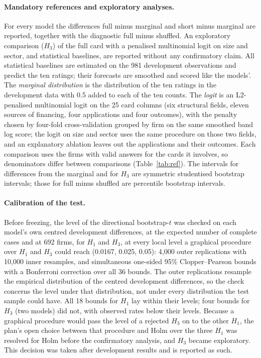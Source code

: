 \documentclass[11pt]{article}
\begin{document}
\paragraph{Mandatory references and exploratory analyses.} For every model the differences full minus marginal and
short minus marginal are reported, together with the diagnostic full minus shuffled. An exploratory comparison
($H_3$) of the full card with a penalised multinomial logit on size and sector, and statistical baselines, are reported
without any confirmatory claim. All statistical baselines are estimated on the 981 development observations and
predict the ten ratings; their forecasts are smoothed and scored like the models'. The \emph{marginal distribution}
is the distribution of the ten ratings in the development data with 0.5 added to each of the ten counts. The
\emph{logit} is an L2-penalised multinomial logit on the 25 card columns (six structural fields, eleven sources of
financing, four applications and four outcomes), with the penalty chosen by four-fold cross-validation grouped by firm
on the same smoothed band log score; the logit on size and sector uses the same procedure on those two fields, and an
explanatory ablation leaves out the applications and their outcomes. Each comparison uses the firms with valid answers
for the cards it involves, so denominators differ between comparisons (Table~\ref{tab:ref}). The intervals for
differences from the marginal and for $H_3$ are symmetric studentised bootstrap intervals; those for full minus
shuffled are percentile bootstrap intervals.

\paragraph{Calibration of the test.} Before freezing, the level of the directional bootstrap-$t$ was checked on each
model's own centred development differences, at the expected number of complete cases and at 692 firms, for $H_1$ and
$H_3$, at every local level a graphical procedure over $H_1$ and $H_3$ could reach (0.0167, 0.025, 0.05): 4{,}000 outer
replications with 10{,}000 inner resamples, and simultaneous one-sided 95\% Clopper--Pearson bounds \citep{clopper1934}
with a Bonferroni correction over all 36 bounds. The outer replications resample the empirical distribution of the
centred development differences, so the check concerns the level under that distribution, not under every
distribution the test sample could have. All 18 bounds for $H_1$ lay within their levels; four bounds for $H_3$
(two models) did not, with observed rates below their levels. Because a graphical procedure \citep{bretz2009,bretz2011}
would pass the level of a rejected $H_3$ on to the other $H_1$, the plan's open choice between that procedure and Holm
over the three $H_1$ was resolved for Holm before the confirmatory analysis, and $H_3$ became exploratory. This decision
was taken after development results and is reported as such.
\end{document}
